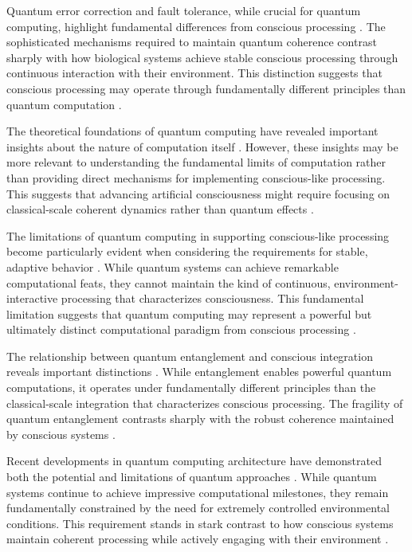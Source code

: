 \begin{refsection}
Quantum error correction and fault tolerance, while crucial for quantum computing, highlight fundamental differences from conscious processing \cite{Harrow2020}. The sophisticated mechanisms required to maintain quantum coherence contrast sharply with how biological systems achieve stable conscious processing through continuous interaction with their environment. This distinction suggests that conscious processing may operate through fundamentally different principles than quantum computation \cite{Kitaev2018}.

The theoretical foundations of quantum computing have revealed important insights about the nature of computation itself \cite{Montanaro2021}. However, these insights may be more relevant to understanding the fundamental limits of computation rather than providing direct mechanisms for implementing conscious-like processing. This suggests that advancing artificial consciousness might require focusing on classical-scale coherent dynamics rather than quantum effects \cite{Nielsen2020}.

The limitations of quantum computing in supporting conscious-like processing become particularly evident when considering the requirements for stable, adaptive behavior \cite{Preskill2019}. While quantum systems can achieve remarkable computational feats, they cannot maintain the kind of continuous, environment-interactive processing that characterizes consciousness. This fundamental limitation suggests that quantum computing may represent a powerful but ultimately distinct computational paradigm from conscious processing \cite{Shor2019}.

The relationship between quantum entanglement and conscious integration reveals important distinctions \cite{Svore2020}. While entanglement enables powerful quantum computations, it operates under fundamentally different principles than the classical-scale integration that characterizes conscious processing. The fragility of quantum entanglement contrasts sharply with the robust coherence maintained by conscious systems \cite{Terhal2018}.

Recent developments in quantum computing architecture have demonstrated both the potential and limitations of quantum approaches \cite{Wallraff2021}. While quantum systems continue to achieve impressive computational milestones, they remain fundamentally constrained by the need for extremely controlled environmental conditions. This requirement stands in stark contrast to how conscious systems maintain coherent processing while actively engaging with their environment \cite{Zhong2020}.


\end{refsection}
